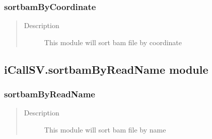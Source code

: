 \documentclass[letterpaper,10pt,english]{sphinxmanual}
\begin{document}
\subsubsection{sortbamByCoordinate}
\label{iCallSV:sortbambycoordinate}\begin{quote}\begin{description}
\item[{Description}] \leavevmode
This module will sort bam file by coordinate

\end{description}\end{quote}

\begin{fulllineitems}
\label{iCallSV:iCallSV.sortbamByCoordinate.sortBam}
\end{fulllineitems}



\subsection{iCallSV.sortbamByReadName module}
\label{iCallSV:module-iCallSV.sortbamByReadName}\label{iCallSV:icallsv-sortbambyreadname-module}

\subsubsection{sortbamByReadName}
\label{iCallSV:sortbambyreadname}\begin{quote}\begin{description}
\item[{Description}] \leavevmode
This module will sort bam file by name

\end{description}\end{quote}

\begin{fulllineitems}
\label{iCallSV:iCallSV.sortbamByReadName.sortBam}
\end{fulllineitems}
\end{document}
